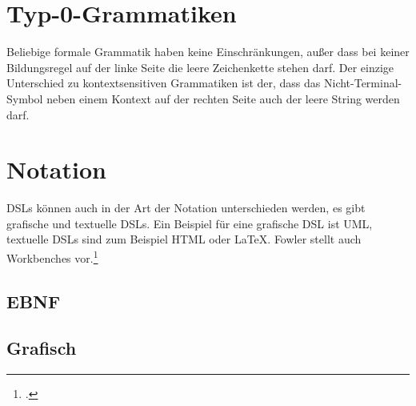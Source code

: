 \documentclass[../InterneDSLs.tex]{subfiles}
\begin{document}
\section{Typ-0-Grammatiken}\label{sec:beliebigegrammatik}
Beliebige formale Grammatik haben keine Einschränkungen, außer dass bei keiner Bildungsregel auf der linke Seite die leere Zeichenkette stehen darf. Der einzige Unterschied zu kontextsensitiven Grammatiken ist der, dass das Nicht-Terminal-Symbol neben einem Kontext auf der rechten Seite auch der leere String werden darf.


\section{Notation}
DSLs können auch in der Art der Notation unterschieden werden, es gibt grafische und textuelle DSLs. Ein Beispiel für eine grafische DSL ist UML, textuelle DSLs sind zum Beispiel HTML oder LaTeX. Fowler stellt auch Workbenches vor.\footcite[][S. 22ff]{Fowler.2010}

\subsection{EBNF}

\subsection{Grafisch}
\end{document}
